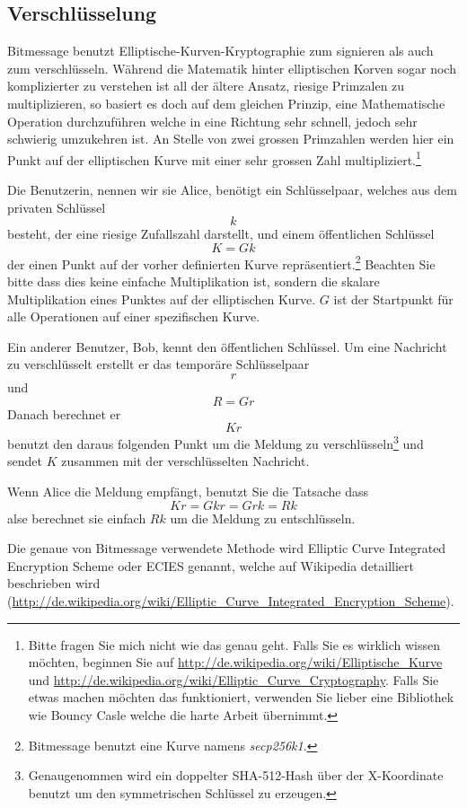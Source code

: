 \documentclass{bfh}
\begin{document}
  \subsection{Verschlüsselung}

  Bitmessage benutzt Elliptische-Kurven-Kryptographie zum signieren als auch zum verschlüsseln. Während die Matematik hinter elliptischen Korven sogar noch komplizierter zu verstehen ist all der ältere Ansatz, riesige Primzalen zu multiplizieren, so basiert es doch auf dem gleichen Prinzip, eine Mathematische Operation durchzuführen welche in eine Richtung sehr schnell, jedoch sehr schwierig umzukehren ist. An Stelle von zwei grossen Primzahlen werden hier ein Punkt auf der elliptischen Kurve mit einer sehr grossen Zahl multipliziert.\footnote{Bitte fragen Sie mich nicht wie das genau geht. Falls Sie es wirklich wissen möchten, beginnen Sie auf \url{http://de.wikipedia.org/wiki/Elliptische_Kurve} und \url{http://de.wikipedia.org/wiki/Elliptic_Curve_Cryptography}. Falls Sie etwas machen möchten das funktioniert, verwenden Sie lieber eine Bibliothek wie Bouncy Casle welche die harte Arbeit übernimmt.}

  Die Benutzerin, nennen wir sie Alice, benötigt ein Schlüsselpaar, welches aus dem privaten Schlüssel
$$k$$
besteht, der eine riesige Zufallszahl darstellt, und einem öffentlichen Schlüssel
$$K = G k$$
der einen Punkt auf der vorher definierten Kurve repräsentiert.\footnote{Bitmessage benutzt eine Kurve namens \textit{secp256k1}.} Beachten Sie bitte dass dies keine einfache Multiplikation ist, sondern die skalare Multiplikation eines Punktes auf der elliptischen Kurve. $G$ ist der Startpunkt für alle Operationen auf einer spezifischen Kurve.

  Ein anderer Benutzer, Bob, kennt den öffentlichen Schlüssel. Um eine Nachricht zu verschlüsselt erstellt er das temporäre Schlüsselpaar
$$r$$
und
$$R = G r$$
Danach berechnet er
$$K r$$
benutzt den daraus folgenden Punkt um die Meldung zu verschlüsseln\footnote{Genaugenommen wird ein doppelter SHA-512-Hash über der X-Koordinate benutzt um den symmetrischen Schlüssel zu erzeugen.} und sendet $K$ zusammen mit der verschlüsselten Nachricht.

  Wenn Alice die Meldung empfängt, benutzt Sie die Tatsache dass
$$K r = G k r = G r k = R k$$
alse berechnet sie einfach $R k$ um die Meldung zu entschlüsseln.

  Die genaue von Bitmessage verwendete Methode wird Elliptic Curve Integrated Encryption Scheme oder ECIES genannt, welche auf Wikipedia detailliert beschrieben wird (\url{http://de.wikipedia.org/wiki/Elliptic_Curve_Integrated_Encryption_Scheme}).
\end{document}
